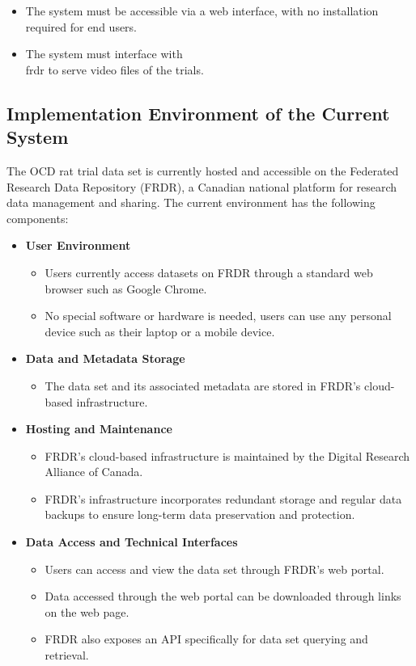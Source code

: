 \documentclass[12pt]{article}
\begin{document}
\begin{itemize}
    \item The system must be accessible via a web interface, with no installation required for end users.
    \item The system must interface with \\ \gls{frdr} to serve video files of the trials.
\end{itemize}

\subsection{Implementation Environment of the Current System}

\par{The OCD rat trial data set is currently hosted and accessible on the Federated Research Data Repository (FRDR), 
a Canadian national platform for research data management and sharing. The current environment has the following components:}

\begin{itemize}
    \item \textbf{User Environment}
    \begin{itemize}
        \item Users currently access datasets on FRDR through a standard web browser such as Google Chrome.
        \item No special software or hardware is needed, users can use any personal device such as their laptop or a mobile device.
    \end{itemize}
    \item \textbf{Data and Metadata Storage}
    \begin{itemize}
        \item The data set and its associated metadata are stored in FRDR's cloud-based infrastructure.
    \end{itemize}
    \item \textbf{Hosting and Maintenance}
    \begin{itemize}
        \item FRDR's cloud-based infrastructure is maintained by the Digital Research Alliance of Canada.
        \item FRDR's infrastructure incorporates redundant storage and regular data backups to ensure long-term data preservation and protection.
    \end{itemize}
    \item \textbf{Data Access and Technical Interfaces}
    \begin{itemize}
        \item Users can access and view the data set through FRDR's web portal.
        \item Data accessed through the web portal can be downloaded through links on the web page.
        \item FRDR also exposes an API specifically for data set querying and retrieval.
    \end{itemize}
\end{itemize}
\end{document}
